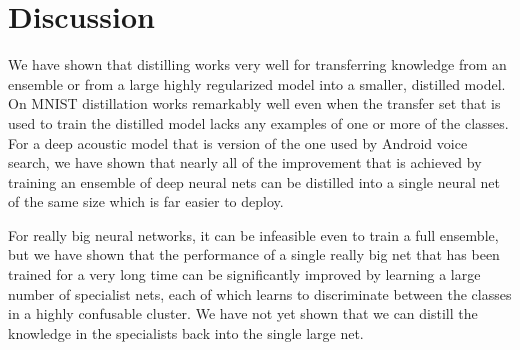 \section{Discussion}

We have shown that distilling works very well for transferring
knowledge from an ensemble or from a large highly regularized model
into a smaller, distilled model. On MNIST distillation works remarkably
well even when the transfer set that is used to train the distilled
model lacks any examples of one or more of the classes. For a deep
acoustic model that is version of the one used by Android voice search, we have shown
that nearly all of the improvement that is achieved by training an
ensemble of deep neural nets can be distilled into a single
neural net of the same size which is far easier to deploy.

For really big neural networks, it can be infeasible even to train a
full ensemble, but we have shown that the performance of a single really big
net that has been trained for a very long time can be significantly
improved by learning a large number of specialist nets, each of which
learns to discriminate between the classes in a highly confusable
cluster. We have not yet shown that we can distill the knowledge in
the specialists back into the single large net.  





